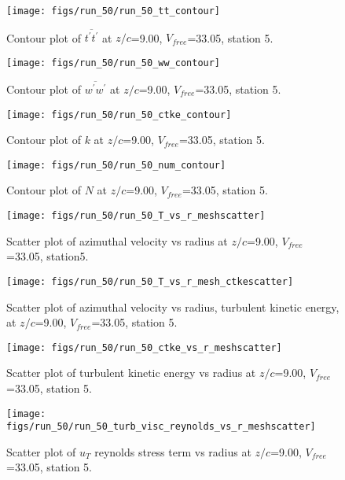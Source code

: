 \begin{figure}[H]
\centering
\texttt{[image: figs/run\_50/run\_50\_tt\_contour]}
\caption{Contour plot of $\overline{t^\prime t^\prime}$ at $z/c$=9.00, $V_{free}$=33.05, station 5.}
\end{figure}


\begin{figure}[H]
\centering
\texttt{[image: figs/run\_50/run\_50\_ww\_contour]}
\caption{Contour plot of $\overline{w^\prime w^\prime}$ at $z/c$=9.00, $V_{free}$=33.05, station 5.}
\end{figure}


\begin{figure}[H]
\centering
\texttt{[image: figs/run\_50/run\_50\_ctke\_contour]}
\caption{Contour plot of $k$ at $z/c$=9.00, $V_{free}$=33.05, station 5.}
\end{figure}


\begin{figure}[H]
\centering
\texttt{[image: figs/run\_50/run\_50\_num\_contour]}
\caption{Contour plot of $N$ at $z/c$=9.00, $V_{free}$=33.05, station 5.}
\end{figure}


\begin{figure}[H]
\centering
\texttt{[image: figs/run\_50/run\_50\_T\_vs\_r\_meshscatter]}
\caption{Scatter plot of azimuthal velocity vs radius at $z/c$=9.00, $V_{free}$=33.05, station5.}
\end{figure}


\begin{figure}[H]
\centering
\texttt{[image: figs/run\_50/run\_50\_T\_vs\_r\_mesh\_ctkescatter]}
\caption{Scatter plot of azimuthal velocity vs radius, turbulent kinetic energy, at $z/c$=9.00, $V_{free}$=33.05, station 5.}
\end{figure}


\begin{figure}[H]
\centering
\texttt{[image: figs/run\_50/run\_50\_ctke\_vs\_r\_meshscatter]}
\caption{Scatter plot of turbulent kinetic energy vs radius at $z/c$=9.00, $V_{free}$=33.05, station 5.}
\end{figure}


\begin{figure}[H]
\centering
\texttt{[image: figs/run\_50/run\_50\_turb\_visc\_reynolds\_vs\_r\_meshscatter]}
\caption{Scatter plot of $
u_T$ reynolds stress term vs radius at $z/c$=9.00, $V_{free}$=33.05, station 5.}
\end{figure}


